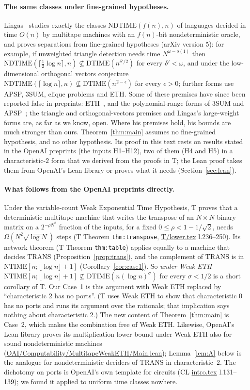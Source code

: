 \documentclass[11pt]{article}
\theoremstyle{definition}
\theoremstyle{remark}
\newcommand{\DTIME}{\mathrm{DTIME}}
\newcommand{\NTIME}{\mathrm{NTIME}}
\newcommand{\TRANS}{\mathrm{TRANS}}
\newcommand{\src}[1]{\url{#1}}
\begin{document}
\paragraph{The same classes under fine-grained hypotheses.} Lingas~\cite{Lin} studies exactly the classes $\mathrm{NDTIME}(f(n),n)$
of languages decided in time $O(n)$ by multitape machines with an $f(n)$-bit nondeterministic oracle, and proves separations from
fine-grained hypotheses (arXiv version 5): for example, if unweighted triangle detection needs time $N^{\omega-o(1)}$ then
$\mathrm{NDTIME}(\lceil\frac12\log n\rceil,n)\not\subseteq\DTIME(n^{\delta'/2})$ for every $\delta'<\omega$, and under the
low-dimensional orthogonal vectors conjecture $\mathrm{NDTIME}(\lceil\log n\rceil,n)\not\subseteq\DTIME(n^{2-\epsilon})$ for every
$\epsilon>0$; further forms use APSP, 3SUM, clique problems and ETH. Some of these premises have since
been reported false in preprints: ETH~\cite{OAI-ETH}, and the polynomial-range forms of 3SUM and APSP~\cite{AVW}; the triangle and
orthogonal-vectors premises and Lingas's large-weight forms are, as far as we know, open. Where his premises hold, his bounds are much
stronger than ours. Theorem~\ref{thm:main} assumes no fine-grained hypothesis, and no other hypothesis. Its proof in this text rests on results stated in the OpenAI
preprints (the inputs H1--H12), two of them (H4 and H5) in a characteristic-$2$ form that we derived from the proofs in T; the Lean
proof takes them from OpenAI's Lean library or proves what it needs (Section~\ref{sec:lean}).

\paragraph{What follows from the OpenAI preprints directly.} Under the variable-count Weak Exponential Time Hypothesis, T proves that
a deterministic multitape machine that writes the transpose of an $N\times N$ binary matrix on a $2^{-\rho N^2}$ fraction of the
inputs, for a fixed $0\le\rho<1-1/\sqrt2$, needs $\Omega(N^2\sqrt{\log N})$ steps (T Theorem \texttt{thm:transpose}, \src{T/lower.tex} l.236--250). Its network theorem
(T Theorem \texttt{thm:table}) applies equally to a machine that decides $\TRANS$ (Proposition~\ref{prop:trans}), and the
complement of $\TRANS$ is in $\NTIME[n;\lfloor\log n\rfloor+1]$ (Corollary~\ref{cor:case1}). So \emph{under Weak ETH}
$\NTIME[n;\lfloor\log n\rfloor+1]\not\subseteq\DTIME(n(\log n)^{\sigma})$ for every $\sigma<1/2$ is a short corollary of T. Our Case~1 is this
argument with Weak ETH replaced by ``characteristic $2$ has no ports''. (T uses Weak ETH to show that characteristic $0$ has no
ports and runs its argument over the rationals; that implication says nothing about characteristic $2$.) The new content of Theorem~\ref{thm:main} is Case~2, which
makes the combination free of Weak ETH. Likewise, OpenAI's Lean library proves its multiplication lower bound under Weak ETH also
for sound nondeterministic machines (\src{OAI/Computability/MultitapeWeakETH/Main.lean}); Lemma~\ref{lem:A} below is the analogue
for nondeterministic deciders of $\TRANS$ in characteristic~$2$. The dichotomy on ports is OpenAI's own template for circuits
(CL \src{intro.tex} l.131--139); we found it applied to uniform time classes nowhere.
\end{document}
